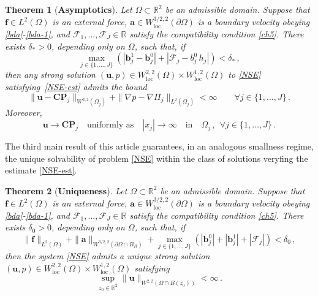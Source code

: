 \documentclass[11pt]{article}
\newtheorem{theorem}{Theorem}[section]
\numberwithin{equation}{section}
\numberwithin{figure}{section}
\def\loc{{\mathrm{loc}}}
\def\Fe{{\mathcal F}}
\def\ue{{\mathbf u}}
\def\fe{{\mathbf f}}
\def\be{{\mathbf b}}
\def\ae{{\mathbf a}}
\def\fe{{\mathbf f}}
\begin{document}
\begin{theorem}[{\bf Asymptotics}]\label{th:main2} Let $\Omega \subset \mathbb{R}^2$ be an admissible domain. Suppose that $\fe\in L^{2}(\Omega)$
is an external force, $\ae\in W^{3/2,2}_\loc(\partial\Omega)$ is a boundary velocity obeying \eqref{bda}-\eqref{bda-1}, and
$\Fe_1,...,\Fe_J \in \mathbb{R}$ satisfy the compatibility condition \eqref{ch5}. There exists $\delta_{*} > 0$,
depending only on $\Omega$, such that, if
\begin{equation}  \label{uni-1}
\max\limits_{j \in \{1, \dots, J\}} \left(|\be_j^1-\be_j^0|  + |\mathcal{F}_j-b_j^0 \, h_j| \right) <\delta_* \, ,
\end{equation}
then any strong solution $(\ue,p)\in W^{2,2}_\loc(\Omega)\times W^{1,2}_\loc(\Omega)$ to \eqref{NSE} satisfying~\eqref{NSE-est} admits the bound
\begin{equation}  \label{uni-2}
	\|\ue - \mathbf{CP}_j\|_{W^{2,2}(\Omega_j)}+\|\nabla p-\nabla\Pi_j\|_{L^2(\Omega_j)}< \infty \qquad \forall j \in \{1,\dots,J \} \, .	
\end{equation}
Moreover, 
\begin{equation} \label{convergencecp}
\ue \longrightarrow \mathbf{CP}_j \quad \text{uniformly as} \quad |x_j| \to \infty \quad \text{in} \quad \Omega_{j} \, , \ \ \forall j \in \{1,\dots,J \} \, .
\end{equation}
\end{theorem}



The third main result of this article guarantees, in an analogous smallness regime, the unique solvability of problem \eqref{NSE}
within the class of solutions veryfing the estimate \eqref{NSE-est}.
	
\begin{theorem}[{\bf Uniqueness}]\label{th:main3} Let $\Omega \subset \mathbb{R}^2$ be an admissible domain.
Suppose that $\fe\in L^{2}(\Omega)$ is an external force, $\ae\in W^{3/2,2}_\loc(\partial\Omega)$ is a boundary velocity obeying
\eqref{bda}-\eqref{bda-1}, and $\Fe_1,...,\Fe_J \in \mathbb{R}$ satisfy the compatibility condition \eqref{ch5}.
There exists $\delta_{0} > 0$, depending only on $\Omega$, such that, if
\begin{equation}  \label{uni-4}
\|\fe\|_{L^2(\Omega)}+\|\ae\|_{W^{3/2,2}(\partial\Omega \cap B_{R})}+
\max\limits_{j \in \{1, \dots, J\}}\left( |\be_j^0|+|\be_j^1|+ |\Fe_j| \right)< \delta_0 \, ,
\end{equation}
then the system \eqref{NSE} admits a unique strong solution $(\ue,p)\in W^{2,2}_\loc(\Omega)\times W^{1,2}_\loc(\Omega)$ satisfying \begin{equation} 
	\sup_{z_0 \in \mathbb{R}^2}\|\ue\|_{W^{2,2}(\Omega\cap B(z_0))}< \infty\,.
\end{equation}
\end{theorem}
\end{document}
